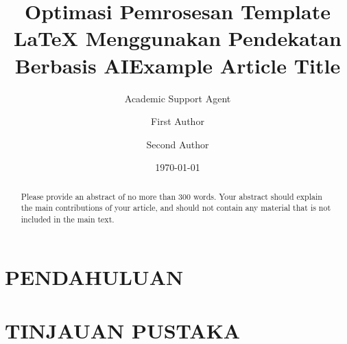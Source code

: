 \documentclass{olplainarticle}
\title{Optimasi Pemrosesan Template LaTeX Menggunakan Pendekatan Berbasis AI}
\author{Academic Support Agent}
\date{\today}
\begin{document}
\maketitle

\begin{abstract}

\end{abstract}

\chapter{PENDAHULUAN}


\chapter{TINJAUAN PUSTAKA}



\title{Example Article Title}

\author[1]{First Author}
\author[2]{Second Author}


\begin{abstract}
Please provide an abstract of no more than 300 words. Your abstract should explain the main contributions of your article, and should not contain any material that is not included in the main text. 
\end{abstract}
\end{document}
